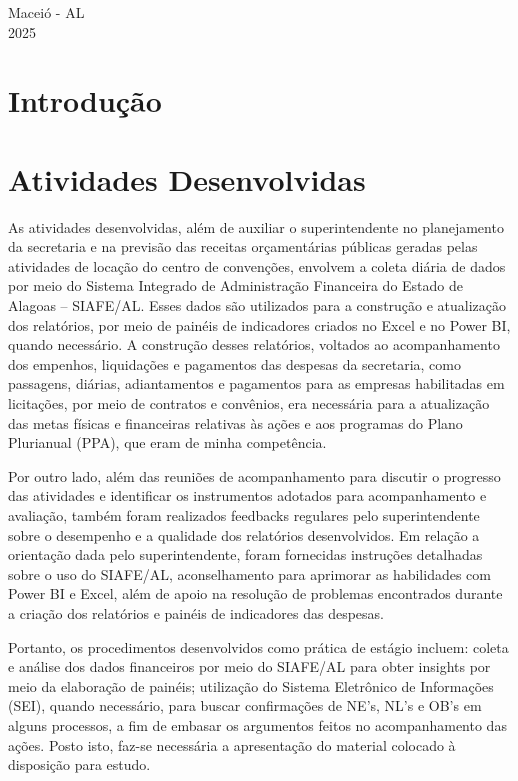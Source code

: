 \documentclass[12pt,a4paper]{article}
\begin{document}
	\vfill
	\begin{flushright}
		\centering Maceió - AL \\
		2025
	\end{flushright}
	
	\newpage
	
	\section{Introdução}
	
	\hspace*{1,5cm}
	
	\section{Atividades Desenvolvidas}
	

	\hspace*{1,5cm} As atividades desenvolvidas, além de auxiliar o superintendente no planejamento da secretaria e 
	na previsão das receitas orçamentárias públicas geradas pelas atividades de locação do centro de convenções, envolvem a coleta diária de dados por meio do Sistema Integrado de Administração Financeira do Estado de Alagoas – SIAFE/AL. Esses dados são utilizados para a construção e atualização dos relatórios, por meio de painéis de indicadores criados no Excel e no Power BI, quando necessário. A construção desses relatórios, voltados ao acompanhamento dos empenhos, liquidações e pagamentos das despesas da secretaria, como passagens, diárias, adiantamentos e pagamentos para as empresas habilitadas em licitações, por meio de contratos e convênios, era necessária para a atualização das metas físicas e financeiras relativas às ações e aos programas do Plano Plurianual (PPA), que eram de minha competência.  

	Por outro lado, além das reuniões de acompanhamento para discutir o progresso das atividades e identificar os instrumentos adotados para acompanhamento e avaliação, também foram realizados feedbacks regulares pelo superintendente sobre o desempenho e a qualidade dos relatórios desenvolvidos. Em relação a orientação dada pelo superintendente, foram fornecidas instruções detalhadas sobre o uso do SIAFE/AL, aconselhamento para aprimorar as habilidades com Power BI e Excel, além de apoio na resolução de problemas encontrados durante a criação dos relatórios e painéis de indicadores das despesas.  
	
	Portanto, os procedimentos desenvolvidos como prática de estágio incluem: coleta e análise dos dados financeiros por meio do SIAFE/AL para obter insights por meio da elaboração de painéis; utilização do Sistema Eletrônico de Informações (SEI), quando necessário, para buscar confirmações de NE’s, NL’s e OB’s em alguns processos, a fim de embasar os argumentos feitos no acompanhamento das ações. Posto isto, faz-se necessária a apresentação do material colocado à disposição para estudo.
\end{document}
